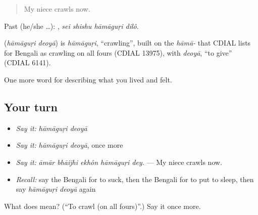 \begin{quote}
My niece crawls now.
\end{quote}

Past (he/she …):    , \emph{sei shishu hāmāguṛi dilô}.

\begin{cousinweb}
\textbf{ } (\emph{hāmāguṛi deoyā}) is \emph{hāmāguṛi}, \textquotedblleft{}crawling\textquotedblright{}, built on the \emph{hāmā-} that CDIAL lists for Bengali as crawling on all fours (CDIAL 13975), with \emph{deoyā}, \textquotedblleft{}to give\textquotedblright{} (CDIAL 6141).
\end{cousinweb}

\begin{grammarlens}[title={What you've built}]
One more word for describing what you lived and felt.
\end{grammarlens}

\subsection*{Your turn}
\begin{itemize}
\raggedright
  \item \emph{Say it:} \emph{hāmāguṛi deoyā}
  \item \emph{Say it:} \emph{hāmāguṛi deoyā}, once more
  \item \emph{Say it:} \emph{āmār bhāijhi ekhôn hāmāguṛi dey.} — My niece crawls now.
  \item \emph{Recall:} say the Bengali for to suck, then the Bengali for to put to sleep, then say \emph{hāmāguṛi deoyā} again
\end{itemize}

\begin{tcolorbox}[breakable,colback=teal!4,colframe=teal!35!black,title={Before you move on}]
What does   mean? (\textquotedblleft{}To crawl (on all fours)\textquotedblright{}.) Say it once more.
\end{tcolorbox}
